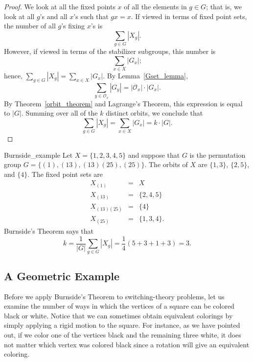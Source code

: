  
\begin{proof}
We look at all the fixed points $x$ of all the elements in $g \in G$;
that is, we look at all $g$'s and all $x$'s such that $gx =x$.
If viewed in terms of fixed point sets, the number of all $g$'s fixing
$x$'s is 
\[
\sum_{g \in G} |X_g|.
\]
However, if viewed in terms of the stabilizer subgroups, this number
is 
\[
\sum_{x \in X} |G_x|;
\]
hence, $\sum_{g \in G} |X_g| = \sum_{x \in X} |G_x|$. By Lemma~\ref{Gset_lemma}, 
\[
\sum_{y \in {\mathcal O}_x} |G_y|  =  | {\mathcal O}_x| \cdot |G_x|.
\]
By Theorem~\ref{orbit_theorem} and Lagrange's Theorem, this expression is equal 
to $|G|$. Summing over all of the $k$ distinct orbits, we conclude that
\[
\sum_{g \in G} |X_g| = \sum_{x \in X} |G_x| = k \cdot |G|.
\]
\end{proof}
 
 
\begin{example}{Burnside_example}
Let $X = \{1, 2, 3, 4, 5 \}$ and suppose that $G$ is the permutation
group $G= \{(1), (1 3), (1 3)(2 5), (2 5) \}$. The orbits of $X$ are
$\{1, 3\}$, $\{2, 5\}$, and $\{4\}$. The fixed point sets are 
\begin{eqnarray*}
X_{(1)} & = & X \\
X_{(1 3)} & = & \{2, 4, 5 \} \\
X_{(1 3)(2 5)} & = & \{4\} \\
X_{(2 5)} & = & \{1, 3, 4 \} .
\end{eqnarray*}
Burnside's Theorem says that
\[
k = \frac{1}{|G|} \sum_{g \in G} |X_g| = \frac{1}{4}(5+
3+1+3) = 3.
\]
\end{example}
 
 
 
\subsection*{A Geometric Example}
 
 
 
Before we apply Burnside's Theorem to switching-theory problems, let
us examine the number of ways in which the vertices of a square can be
colored black or white. Notice that we can sometimes obtain equivalent
colorings by simply applying a rigid motion to the square. For
instance, as we have pointed out, if we color one of the vertices
black and the remaining three white, it does not matter which vertex
was colored black since a rotation will give an equivalent coloring.  
 
